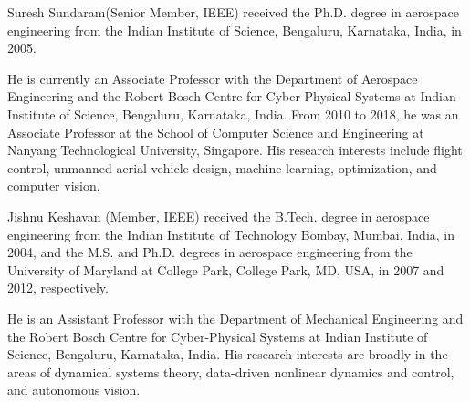\documentclass{IEEEtaes}
\begin{document}
\begin{IEEEbiography}{Suresh Sundaram}(Senior Member, IEEE) received the Ph.D. degree in aerospace engineering from the Indian Institute of Science, Bengaluru, Karnataka, India, in 2005.

He is currently an Associate Professor with the Department of Aerospace Engineering and the Robert Bosch Centre for Cyber-Physical Systems at Indian Institute of Science, Bengaluru, Karnataka, India. From 2010 to 2018, he was an Associate Professor at the School of Computer Science and Engineering at Nanyang Technological University, Singapore. His research interests include flight control, unmanned aerial vehicle design, machine learning, optimization, and computer vision.
\end{IEEEbiography}

\begin{IEEEbiography}{Jishnu Keshavan} (Member, IEEE)  received the B.Tech. degree in aerospace engineering from the Indian Institute of Technology Bombay, Mumbai, India, in 2004, and the M.S. and Ph.D. degrees in aerospace engineering from the University of Maryland at College Park, College Park, MD, USA, in 2007 and 2012, respectively.

He is an Assistant Professor with the Department of Mechanical Engineering and the Robert Bosch Centre for Cyber-Physical Systems at Indian Institute of Science, Bengaluru, Karnataka, India. His research interests are broadly in the areas of dynamical systems theory, data-driven nonlinear dynamics and control, and autonomous vision.
\end{IEEEbiography}
\end{document}
